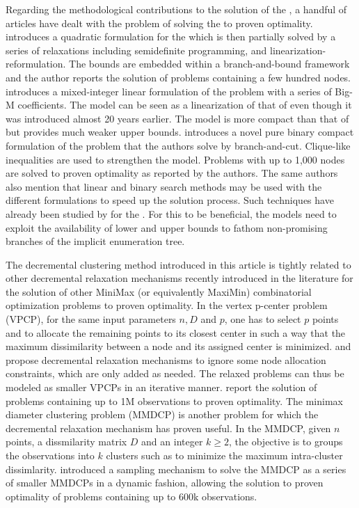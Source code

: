 \documentclass[ijoo,nonblindrev]{informs-ijoo}
\begin{document}
Regarding the methodological contributions to the solution of the \pDP{}, a handful of articles have dealt with the problem of solving the \pDP{} to proven optimality. \citet{Pisinger2006Upper} introduces a quadratic formulation for the \pDP{} which is then partially solved by a series of relaxations including semidefinite programming, and linearization-reformulation. The bounds are embedded within a branch-and-bound framework and the author reports the solution of problems containing a few hundred nodes. \citet{Kuby1987Programming} introduces a mixed-integer linear formulation of the problem with a series of Big-M coefficients. The model can be seen as a linearization of that of \citet{Pisinger2006Upper} even though it was introduced almost 20 years earlier. The model is more compact than that of \citet{Pisinger2006Upper} but provides much weaker upper bounds. \citet{Sayah2017new} introduces a novel pure binary compact formulation of the problem that the authors solve by branch-and-cut. Clique-like inequalities are used to strengthen the model. Problems with up to 1,000 nodes are solved to proven optimality as reported by the authors. The same authors also mention that linear and binary search methods may be used with the different formulations to speed up the solution process. Such techniques have already been studied by \citet{Chandrasekaran1981Location, Pisinger2006Upper} for the \pDP{}. For this to be beneficial, the models need to exploit the availability of lower and upper bounds to fathom non-promising branches of the implicit enumeration tree.

The decremental clustering method introduced in this article is tightly related to other decremental relaxation mechanisms recently introduced in the literature for the solution of other MiniMax (or equivalently MaxiMin) combinatorial optimization problems to proven optimality. In the vertex p-center problem (VPCP), for the same input parameters $n, D$ and $p$, one has to select $p$ points and to allocate the remaining points to its closest center in such a way that the maximum dissimilarity between a node and its assigned center is minimized. \citet{Chen2009New} and \citet{Contardo2019scalable} propose decremental relaxation mechanisms to ignore some node allocation constraints, which are only added as needed. The relaxed problems can thus be modeled as smaller VPCPs in an iterative manner. \citet{Contardo2019scalable} report the solution of problems containing up to 1M observations to proven optimality. The minimax diameter clustering problem (MMDCP) is another problem for which the decremental relaxation mechanism has proven useful. In the MMDCP, given $n$ points, a dissmilarity matrix $D$ and an integer $k\geq 2$, the objective is to groups the observations into $k$ clusters such as to minimize the maximum intra-cluster dissimlarity. \citet{Aloise2018sampling} introduced a sampling mechanism to solve the MMDCP as a series of smaller MMDCPs in a dynamic fashion, allowing the solution to proven optimality of problems containing up to 600k observations.
\end{document}
